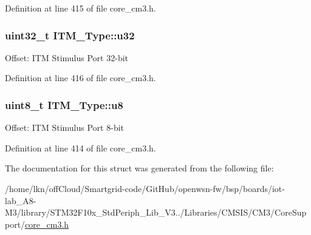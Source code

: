 Definition at line 415 of file core\+\_\+cm3.\+h.

\subsubsection[{\texorpdfstring{u32}{u32}}]{ {\bf uint32\+\_\+t} I\+T\+M\+\_\+\+Type\+::u32}\hypertarget{struct_i_t_m___type_a6882fa5af67ef5c5dfb433b3b68939df}{}\label{struct_i_t_m___type_a6882fa5af67ef5c5dfb433b3b68939df}
Offset\+: I\+TM Stimulus Port 32-\/bit 

Definition at line 416 of file core\+\_\+cm3.\+h.

\subsubsection[{\texorpdfstring{u8}{u8}}]{ {\bf uint8\+\_\+t} I\+T\+M\+\_\+\+Type\+::u8}\hypertarget{struct_i_t_m___type_abea77b06775d325e5f6f46203f582433}{}\label{struct_i_t_m___type_abea77b06775d325e5f6f46203f582433}
Offset\+: I\+TM Stimulus Port 8-\/bit 

Definition at line 414 of file core\+\_\+cm3.\+h.



The documentation for this struct was generated from the following file\+:\begin{DoxyCompactItemize}
\item 
/home/lkn/off\+Cloud/\+Smartgrid-\/code/\+Git\+Hub/openwsn-\/fw/bsp/boards/iot-\/lab\+\_\+\+A8-\/\+M3/library/\+S\+T\+M32\+F10x\+\_\+\+Std\+Periph\+\_\+\+Lib\+\_\+\+V3../\+Libraries/\+C\+M\+S\+I\+S/\+C\+M3/\+Core\+Support/\hyperlink{iot-lab___a8-_m3_2library_2_s_t_m32_f10x___std_periph___lib___v3_85_80_2_libraries_2_c_m_s_i_s_241d01c0ea18c1090ebeb06e5ef0ea5eb}{core\+\_\+cm3.\+h}\end{DoxyCompactItemize}
